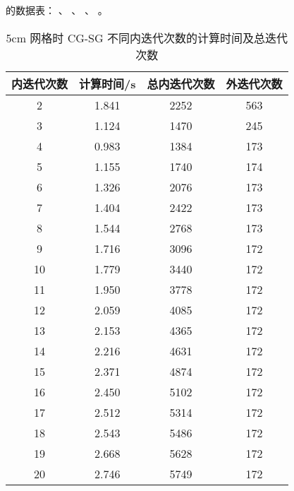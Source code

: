 \begin{datasheet}
的数据表：
、
、
、
。

\begin{table}
\centering
\caption{5cm 网格时 CG-SG 不同内迭代次数的计算时间及总迭代次数}
\label{tab:equsolve.iter.cg-sg.5cm}
\begin{tabular}{cccc}
\toprule
内迭代次数 & 计算时间/s & 总内迭代次数 & 外迭代次数\\
\midrule
2 & 1.841 & 2252 & 563\\
3 & 1.124 & 1470 & 245\\
4 & 0.983 & 1384 & 173\\
5 & 1.155 & 1740 & 174\\
6 & 1.326 & 2076 & 173\\
7 & 1.404 & 2422 & 173\\
8 & 1.544 & 2768 & 173\\
9 & 1.716 & 3096 & 172\\
10 & 1.779 & 3440 & 172\\
11 & 1.950 & 3778 & 172\\
12 & 2.059 & 4085 & 172\\
13 & 2.153 & 4365 & 172\\
14 & 2.216 & 4631 & 172\\
15 & 2.371 & 4874 & 172\\
16 & 2.450 & 5102 & 172\\
17 & 2.512 & 5314 & 172\\
18 & 2.543 & 5486 & 172\\
19 & 2.668 & 5628 & 172\\
20 & 2.746 & 5749 & 172\\
\bottomrule
\end{tabular}
\end{table}


\end{datasheet}

